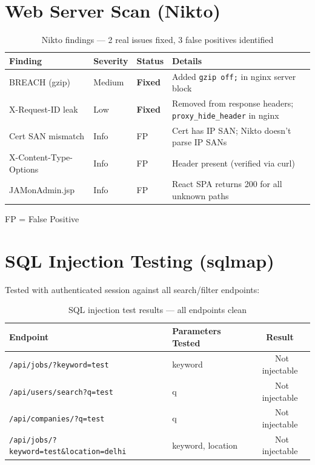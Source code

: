 \documentclass[12pt,a4paper]{article}
\newcommand{\pass}{\textcolor{success}{\checkmark}}
\newcommand{\fixd}{\textcolor{fixed}{\textbf{Fixed}}}
\begin{document}
\section{Web Server Scan (Nikto)}

\begin{table}[H]
\centering
\begin{tabularx}{\textwidth}{lllX}
\toprule
\textbf{Finding} & \textbf{Severity} & \textbf{Status} & \textbf{Details} \\
\midrule
BREACH (gzip) & Medium & \fixd & Added \texttt{gzip off;} in nginx server block \\
X-Request-ID leak & Low & \fixd & Removed from response headers; \texttt{proxy\_hide\_header} in nginx \\
Cert SAN mismatch & Info & \textcolor{success}{FP} & Cert has IP SAN; Nikto doesn't parse IP SANs \\
X-Content-Type-Options & Info & \textcolor{success}{FP} & Header present (verified via curl) \\
JAMonAdmin.jsp & Info & \textcolor{success}{FP} & React SPA returns 200 for all unknown paths \\
\bottomrule
\end{tabularx}
\caption{Nikto findings --- 2 real issues fixed, 3 false positives identified}
\end{table}

FP = False Positive

\section{SQL Injection Testing (sqlmap)}

Tested with authenticated session against all search/filter endpoints:

\begin{table}[H]
\centering
\begin{tabularx}{\textwidth}{XXc}
\toprule
\textbf{Endpoint} & \textbf{Parameters Tested} & \textbf{Result} \\
\midrule
\texttt{/api/jobs/?keyword=test} & keyword & \pass\ Not injectable \\
\texttt{/api/users/search?q=test} & q & \pass\ Not injectable \\
\texttt{/api/companies/?q=test} & q & \pass\ Not injectable \\
\texttt{/api/jobs/?keyword=test\&location=delhi} & keyword, location & \pass\ Not injectable \\
\bottomrule
\end{tabularx}
\caption{SQL injection test results --- all endpoints clean}
\end{table}
\end{document}
